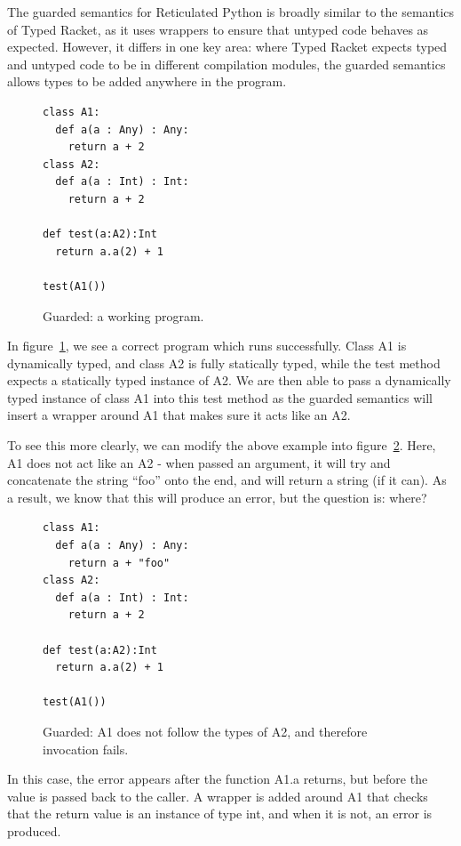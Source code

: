 \documentclass[a4paper,USenglish]{tex/lipics-v2016}
\begin{document}
The guarded semantics for Reticulated Python is broadly similar to the
semantics of Typed Racket, as it uses wrappers to ensure that untyped code
behaves as expected.  However, it differs in one key area: where Typed
Racket expects typed and untyped code to be in different compilation
modules, the guarded semantics allows types to be added anywhere in the
program.

\begin{figure}[h]
\begin{verbatim}
class A1:
  def a(a : Any) : Any:
    return a + 2
class A2:
  def a(a : Int) : Int:
    return a + 2

def test(a:A2):Int
  return a.a(2) + 1

test(A1())
\end{verbatim}
\caption{Guarded: a working program.}
\label{fig:guard1}
\end{figure}

In figure~\ref{fig:guard1}, we see a correct program which runs
successfully. Class A1 is dynamically typed, and class A2 is fully
statically typed, while the test method expects a statically typed instance
of A2. We are then able to pass a dynamically typed instance of class A1
into this test method as the guarded semantics will insert a wrapper around
A1 that makes sure it acts like an A2.

To see this more clearly, we can modify the above example into
figure~\ref{fig:guard2}. Here, A1 does not act like an A2 - when passed an
argument, it will try and concatenate the string ``foo'' onto the end, and
will return a string (if it can). As a result, we know that this will
produce an error, but the question is: where?

\begin{figure}[h]
\begin{verbatim}
class A1:
  def a(a : Any) : Any:
    return a + "foo"
class A2:
  def a(a : Int) : Int:
    return a + 2

def test(a:A2):Int
  return a.a(2) + 1

test(A1())
\end{verbatim}
\caption{Guarded: A1 does not follow the types of A2, and therefore invocation fails.}
\label{fig:guard2}
\end{figure}

In this case, the error appears after the function A1.a returns, but before
the value is passed back to the caller. A wrapper is added around A1 that
checks that the return value is an instance of type int, and when it is not,
an error is produced.
\end{document}
